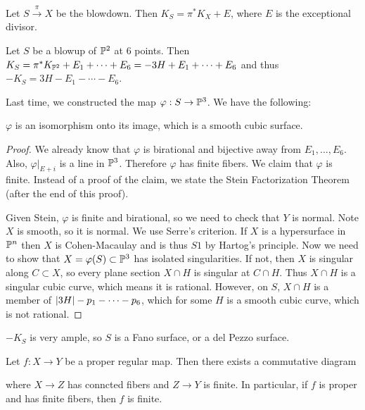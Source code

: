 \documentclass[twoside, 10pt]{article}
\begin{document}
        \begin{thm} Let $S \overset{\pi}{\to} X$ be the blowdown. Then $K_S =
        \pi^*K_X + E$, where $E$ is the exceptional divisor.  \end{thm}

        \begin{cor} Let $S$ be a blowup of $\P^2$ at $6$ points. Then $K_S =
        \pi^* K_{\P^2} + E_1 + \cdots + E_6 = -3H + E_1 + \cdots + E_6$ and
    thus $-K_S = 3H - E_1 - \cdots - E_6$.  \end{cor}

        Last time, we constructed the map $\varphi:S \to \P^3$. We have the
        following:

        \begin{thm} $\varphi$ is an isomorphism onto its image, which is a
            smooth cubic surface.  \begin{proof} We already know that $\varphi$
                is birational and bijective away from $E_1, \ldots, E_6$. Also,
                $\varphi|_{E+i}$ is a line in $\P^3$. Therefore $\varphi$ has
                finite fibers. We claim that $\varphi$ is finite. Instead of a
                proof of the claim, we state the Stein Factorization Theorem
                (after the end of this proof).

                Given Stein, $\varphi$ is finite and birational, so we need to
                check that $Y$ is normal. Note $X$ is smooth, so it is normal.
                We use Serre's criterion. If $X$ is a hypersurface in $\P^n$
                then $X$ is Cohen-Macaulay and is thus $S1$ by Hartog's
                principle. Now we need to show that $X = \varphi(S) \subset
                \P^3$ has isolated singularities. If not, then $X$ is singular
                along $C \subset X$, so every plane section $X \cap H$ is
                singular at $C \cap H$. Thus $X \cap H$ is a singular cubic
                curve, which means it is rational. However, on $S$, $X \cap H$
                is a member of $\abs{3H} - p_1 - \cdots - p_6$, which for some
            $H$ is a smooth cubic curve, which is not rational.  \end{proof}
        \end{thm}

        \begin{cor} $-K_S$ is very ample, so $S$ is a Fano surface, or a del
        Pezzo surface.  \end{cor}
        
        \begin{thm} Let $f: X \to Y$ be a proper
            regular map. Then there exists a commutative diagram \begin{center}
                 \end{center} where $X \to Z$ has conncted fibers
                and $Z \to Y$ is finite. In particular, if $f$ is proper and
            has finite fibers, then $f$ is finite.  \end{thm}
        
    
\end{document}
